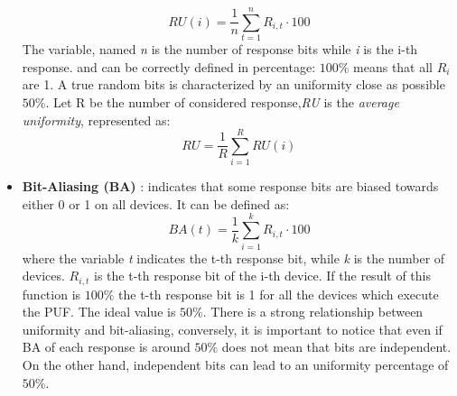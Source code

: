\documentclass[../tesi.tex]{subfiles}
\begin{document}
\begin{itemize}
\begin{equation}
RU(i) = \frac{1}{n} \sum^{n}_{t=1} R_{i,t} \cdot 100
\end{equation}
The variable, named \emph{n} is the number of response bits while \emph{i} is the i-th response. and can be correctly defined in percentage: $100\%$ means that all $R_{i}$ are 1.  A true random bits is characterized by an uniformity close as possible $50\%$. Let R be the number of considered response,\emph{RU} is the \emph{average uniformity}, represented as:
\begin{equation}
RU = \frac{1}{R} \sum^{R}_{i=1} RU(i)
\end{equation}
\item \textbf{Bit-Aliasing (BA) }: indicates that some response bits are biased towards either 0 or 1 on all devices. It can be defined as:
\begin{equation}
BA(t) = \frac{1}{k} \sum^{k}_{i=1} R_{i,t} \cdot 100
\end{equation}
where the variable \emph{t} indicates the t-th response bit, while \emph{k} is the number of devices. $R_{i,t}$ is the t-th response bit of the i-th device. If the result of this function is $100\%$ the t-th response bit is 1 for all the devices which execute the PUF. The ideal value is $50\%$. There is a strong relationship between uniformity and bit-aliasing, conversely, it is important to notice that even if BA of each response is around $50\%$ does not mean that bits are independent. On the other hand, independent bits can  lead to an uniformity percentage of $50\%$. 
\end{itemize}
\end{document}
